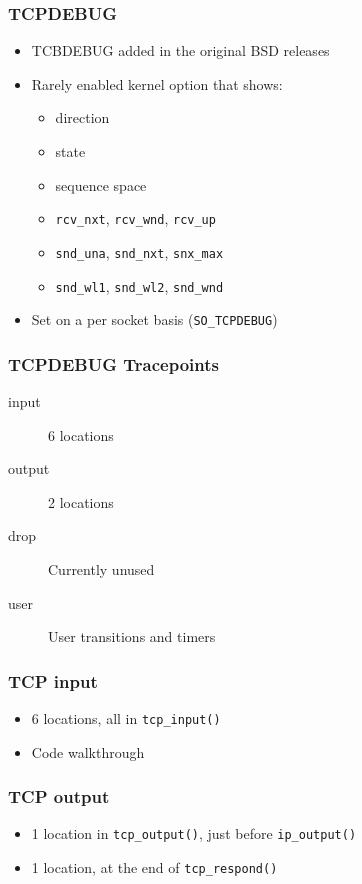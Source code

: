 \documentclass[pdftex]{beamer}
\begin{document}
\begin{frame}[fragile]
  \frametitle{TCPDEBUG}
  \begin{itemize}
  \item TCBDEBUG added in the original BSD releases
  \item Rarely enabled kernel option that shows:
    \begin{itemize}
    \item direction
    \item state
    \item sequence space
    \item \verb|rcv_nxt|, \verb|rcv_wnd|, \verb|rcv_up|
    \item \verb|snd_una|, \verb|snd_nxt|, \verb|snx_max|
    \item \verb|snd_wl1|, \verb|snd_wl2|, \verb|snd_wnd|
    \end{itemize}
  \item Set on a per socket basis (\verb|SO_TCPDEBUG|)
  \end{itemize}
\end{frame}

\begin{frame}
  \frametitle{TCPDEBUG Tracepoints}
  \begin{description}
  \item[input] 6 locations
  \item[output] 2 locations
  \item[drop] Currently unused
  \item[user] User transitions and timers
  \end{description}
\end{frame}

\begin{frame}[fragile]
  \frametitle{TCP input}
  \begin{itemize}
  \item 6 locations, all in \verb|tcp_input()|
  \item Code walkthrough
  \end{itemize}
\end{frame}

\begin{frame}[fragile]
  \frametitle{TCP output}
  \begin{itemize}
  \item 1 location in \verb|tcp_output()|, just before \verb|ip_output()|
  \item 1 location, at the end of \verb|tcp_respond()|
  \end{itemize}
\end{frame}
\end{document}
